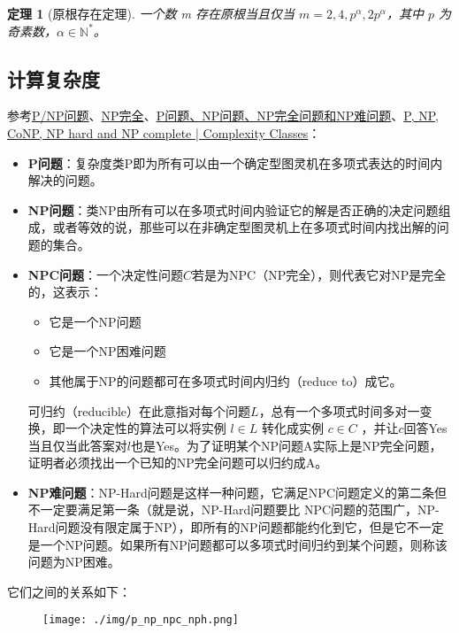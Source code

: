 \documentclass[10pt]{ctexart}
\newtheorem{theorem}{定理}
\begin{document}
\begin{theorem}[原根存在定理]
	一个数 m 存在原根当且仅当 $m=2,4,p^{\alpha},2p^{\alpha}$，其中 $p$ 为奇素数，$\alpha\in \mathbb{N}^{*}$。
\end{theorem}

\subsection{计算复杂度}
参考\href{https://zh.wikipedia.org/wiki/P/NP%E9%97%AE%E9%A2%98}{P/NP问题}、\href{https://zh.wikipedia.org/wiki/NP%E5%AE%8C%E5%85%A8}{NP完全}、\href{https://zhuanlan.zhihu.com/p/73953567}{P问题、NP问题、NP完全问题和NP难问题}、\href{https://www.geeksforgeeks.org/types-of-complexity-classes-p-np-conp-np-hard-and-np-complete/}{P, NP, CoNP, NP hard and NP complete | Complexity Classes}：
\begin{itemize}
	\item \textbf{P问题}：复杂度类P即为所有可以由一个确定型图灵机在多项式表达的时间内解决的问题。
	\item \textbf{NP问题}：类NP由所有可以在多项式时间内验证它的解是否正确的决定问题组成，或者等效的说，那些可以在非确定型图灵机上在多项式时间内找出解的问题的集合。
	\item \textbf{NPC问题}：一个决定性问题$C$若是为NPC（NP完全），则代表它对NP是完全的，这表示：
	\begin{itemize}
		\item 它是一个NP问题
		\item 它是一个NP困难问题
		\item 其他属于NP的问题都可在多项式时间内归约（reduce to）成它。
	\end{itemize}
	可归约（reducible）在此意指对每个问题$L$，总有一个多项式时间多对一变换，即一个决定性的算法可以将实例 $l \in L$ 转化成实例 $c \in C$ ，并让$c$回答Yes当且仅当此答案对$l$也是Yes。为了证明某个NP问题A实际上是NP完全问题，证明者必须找出一个已知的NP完全问题可以归约成A。

	\item \textbf{NP难问题}：NP-Hard问题是这样一种问题，它满足NPC问题定义的第二条但不一定要满足第一条（就是说，NP-Hard问题要比 NPC问题的范围广，NP-Hard问题没有限定属于NP），即所有的NP问题都能约化到它，但是它不一定是一个NP问题。如果所有NP问题都可以多项式时间归约到某个问题，则称该问题为NP困难。
\end{itemize}
它们之间的关系如下：
\begin{figure}[H]
    \centering
    \texttt{[image: ./img/p\_np\_npc\_nph.png]} 
\end{figure}
\end{document}
